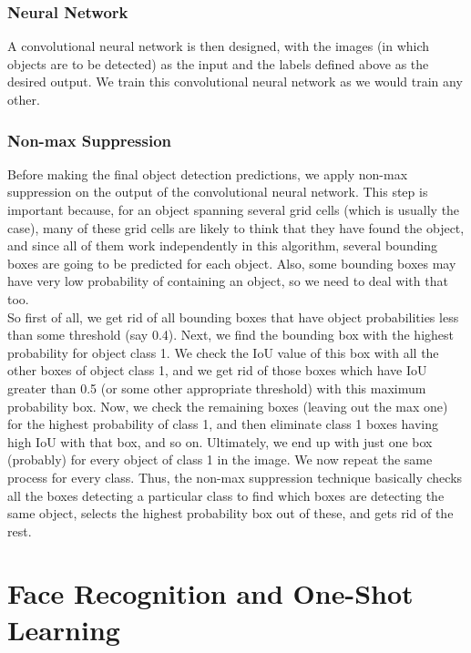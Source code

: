 \documentclass[a4paper, 12pt]{report}
\begin{document}
\subsection{Neural Network}
A convolutional neural network is then designed, with the images (in which objects are to be detected) as the input and the labels defined above as the desired output. We train this convolutional neural network as we would train any other.

\subsection{Non-max Suppression}
Before making the final object detection predictions, we apply non-max suppression on the output of the convolutional neural network. This step is important because, for an object spanning several grid cells (which is usually the case), many of these grid cells are likely to think that they have found the object, and since all of them work independently in this algorithm, several bounding boxes are going to be predicted for each object. Also, some bounding boxes may have very low probability of containing an object, so we need to deal with that too.\\
\break
So first of all, we get rid of all bounding boxes that have object probabilities less than some threshold (say 0.4). Next, we find the bounding box with the highest probability for object class 1. We check the IoU value of this box with all the other boxes of object class 1, and we get rid of those boxes which have IoU greater than 0.5 (or some other appropriate threshold) with this maximum probability box. Now, we check the remaining boxes (leaving out the max one) for the highest probability of class 1, and then eliminate class 1 boxes having high IoU with that box, and so on. Ultimately, we end up with just one box (probably) for every object of class 1 in the image. We now repeat the same process for every class. Thus, the non-max suppression technique basically checks all the boxes detecting a particular class to find which boxes are detecting the same object, selects the highest probability box out of these, and gets rid of the rest.

\chapter{Face Recognition and One-Shot Learning}
\end{document}
